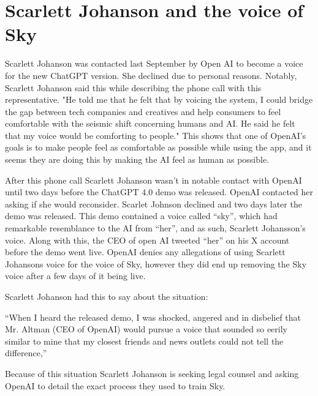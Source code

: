 \section{Scarlett Johanson and the voice of Sky}
\label{sec:ai}




  
Scarlett Johanson was contacted last September by Open AI to become a voice for the new ChatGPT version. She declined due to personal reasons. Notably, Scarlett Johanson said this while describing the phone call with this representative. "He told me that he felt that by voicing the system, I could bridge the gap between tech companies and creatives and help consumers to feel comfortable with the seismic shift concerning humans and AI. He said he felt that my voice would be comforting to people." This shows that one of OpenAI’s goals is to make people feel as comfortable as possible while using the app, and it seems they are doing this by making the AI feel as human as possible. 

After this phone call Scarlett Johanson wasn’t in notable contact with OpenAI until two days before the ChatGPT 4.0 demo was released. OpenAI contacted her asking if she would reconsider. Scarlet Johnson declined and two days later the demo was released. This demo contained a voice called “sky”, which had remarkable resemblance to the AI from “her”, and as such, Scarlett Johansson's voice. Along with this, the CEO of open AI tweeted “her” on his X account before the demo went live. OpenAI denies any allegations of using Scarlett Johansons voice for the voice of Sky, however they did end up removing the Sky voice after a few days of it being live. 

Scarlett Johanson had this to say about the situation: 

“When I heard the released demo, I was shocked, angered and in disbelief that Mr. Altman (CEO of OpenAI) would pursue a voice that sounded so eerily similar to mine that my closest friends and news outlets could not tell the difference,”

Because of this situation Scarlett Johanson is seeking legal counsel and asking OpenAI to detail the exact process they used to train Sky. \cite{scarlett-johansson-article1} \cite{scarlett-johansson-article2}
